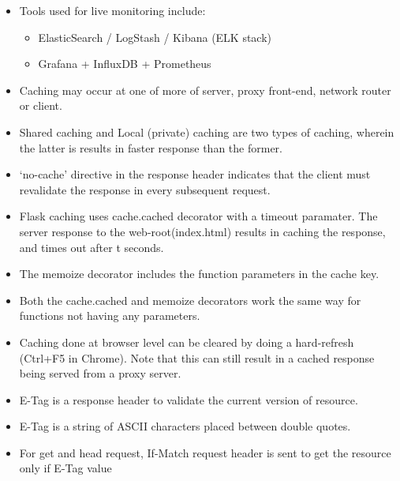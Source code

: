 \documentclass[a4paper]{article}
\begin{document}
\begin{itemize}
    \item Tools used for live monitoring include:
    \begin{itemize}
        \item ElasticSearch / LogStash / Kibana (ELK stack)
        \item Grafana + InfluxDB + Prometheus
    \end{itemize}
    \item Caching may occur at one of more of server, proxy front-end, network router or client.
    \item Shared caching and Local (private) caching are two types of caching, wherein the latter is results in faster response than the former.
    \item ‘no-cache’ directive in the response header indicates that the client must revalidate the response in every subsequent request.
    \item Flask caching  uses cache.cached  decorator with a timeout paramater. The server response to the web-root(index.html) results in caching the response, and times out after t seconds.
    \item The memoize decorator includes the function parameters in the cache key.
    \item Both the cache.cached and memoize  decorators work the same way for functions not having any parameters.
    \item Caching done at browser level can be cleared by doing a hard-refresh (Ctrl+F5 in Chrome). Note that this can still result in a cached response being served from a proxy server.
    \item E-Tag is a response header to validate the current version of resource.
    \item E-Tag is a string of ASCII characters placed between double quotes.
    \item For get and head request, If-Match request header is sent to get the resource only if E-Tag value
\end{itemize}
\end{document}
